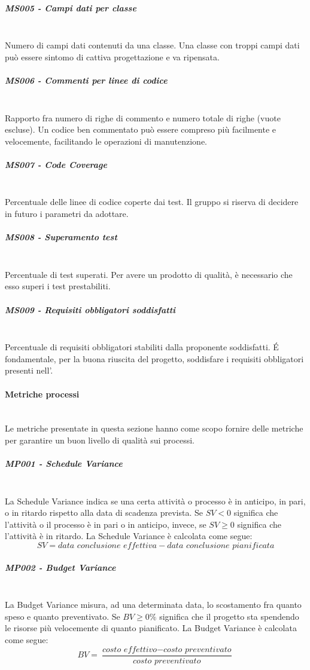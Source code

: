 \subparagraph{MS005 - Campi dati per classe}\mbox{}\\
Numero di campi dati contenuti da una classe. Una classe con troppi campi dati può essere sintomo di cattiva progettazione e va ripensata.
\subparagraph{MS006 - Commenti per linee di codice}\mbox{}\\
Rapporto fra numero di righe di commento e numero totale di righe (vuote escluse). Un codice ben commentato può essere compreso più facilmente e velocemente, facilitando le operazioni di manutenzione.
\subparagraph{MS007 - Code Coverage}\mbox{}\\
Percentuale delle linee di codice coperte dai test.
Il gruppo \gruppo \space si riserva di decidere in futuro i parametri da adottare.
\subparagraph{MS008 - Superamento test}\mbox{}\\
Percentuale di test superati. Per avere un prodotto di qualità, è necessario che esso superi i test prestabiliti.
\subparagraph{MS009 - Requisiti obbligatori soddisfatti}\mbox{}\\
Percentuale di requisiti obbligatori stabiliti dalla proponente soddisfatti. \'E fondamentale, per la buona riuscita del progetto, soddisfare i requisiti obbligatori presenti nell'\AdR .
	
\paragraph{Metriche processi}\mbox{}\\
Le metriche presentate in questa sezione hanno come scopo fornire delle metriche per garantire un buon livello di qualità sui processi.
\subparagraph{MP001 - Schedule Variance}\mbox{}\\
La Schedule Variance indica se una certa attività o processo è in anticipo, in pari, o in ritardo rispetto alla data di scadenza prevista.
Se $SV < 0$ significa che l'attività o il processo è in pari o in anticipo, invece, se $SV \geq 0$ significa che l'attività è in ritardo.
La Schedule Variance è calcolata come segue:
\[
SV = \textit{data conclusione effettiva} - \textit{data conclusione pianificata}
\]
\subparagraph{MP002 - Budget Variance}\mbox{}\\
La Budget Variance misura, ad una determinata data, lo scostamento fra quanto speso e quanto preventivato. Se $BV \geq 0\%$ significa che il progetto sta spendendo le risorse più velocemente di quanto pianificato.
La Budget Variance è calcolata come segue:
\[
BV = \frac{\textit{costo effettivo} - \textit{costo preventivato}}{\textit{costo preventivato}}
\]



